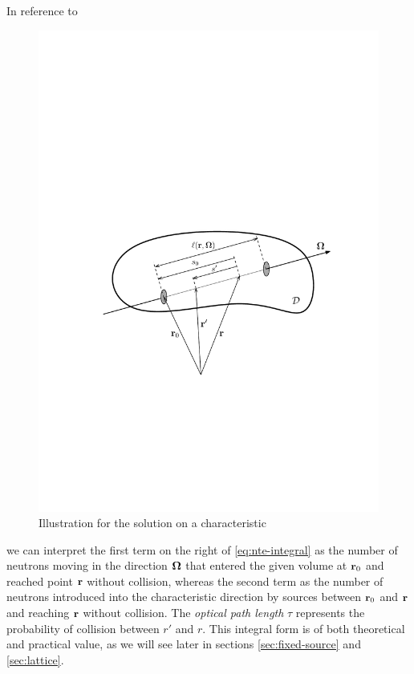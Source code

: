%
In reference to 
\begin{figure}[tbp]
\begin{center}
  \includegraphics[scale=.75]{trepka}
  \caption{Illustration for the solution on a characteristic}
  \label{fig:trepka}
\end{center}
\end{figure}
we can interpret the first term on the right of \eqref{eq:nte-integral} as the number of
neutrons moving in the direction $\mathbf{\Omega}$ that entered the given volume at $\mathbf{r}_0$ and reached point $\mathbf{r}$ without
collision, whereas the second term as the number of neutrons introduced into the characteristic direction by sources 
between $\mathbf{r}_0$ and $\mathbf{r}$ and reaching $\mathbf{r}$ without collision. The \textit{optical path length} $\tau$ represents the 
probability of collision between $r'$ and $r$. This integral form is of both theoretical and practical value, as we will
see later in sections \ref{sec:fixed-source} and \ref{sec:lattice}.

